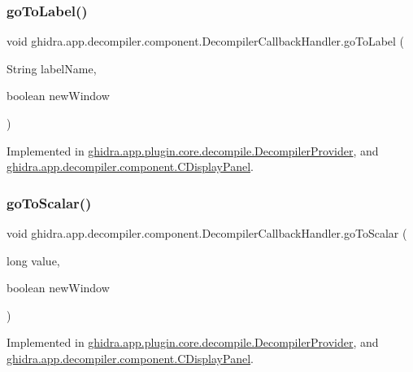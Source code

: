 \subsubsection{\texorpdfstring{goToLabel()}{goToLabel()}}
{\footnotesize\ttfamily void ghidra.\+app.\+decompiler.\+component.\+Decompiler\+Callback\+Handler.\+go\+To\+Label (\begin{DoxyParamCaption}\item[{String}]{label\+Name,  }\item[{boolean}]{new\+Window }\end{DoxyParamCaption})}



Implemented in \mbox{\hyperlink{classghidra_1_1app_1_1plugin_1_1core_1_1decompile_1_1_decompiler_provider_a3012a2929e8b6f83e89da04ee89431d0}{ghidra.\+app.\+plugin.\+core.\+decompile.\+Decompiler\+Provider}}, and \mbox{\hyperlink{classghidra_1_1app_1_1decompiler_1_1component_1_1_c_display_panel_a42edf09645141abad7ba592cab6b2e50}{ghidra.\+app.\+decompiler.\+component.\+C\+Display\+Panel}}.

\mbox{\label{interfaceghidra_1_1app_1_1decompiler_1_1component_1_1_decompiler_callback_handler_a32303b61cd68fd57ce7e33a2973f9372}} 
\subsubsection{\texorpdfstring{goToScalar()}{goToScalar()}}
{\footnotesize\ttfamily void ghidra.\+app.\+decompiler.\+component.\+Decompiler\+Callback\+Handler.\+go\+To\+Scalar (\begin{DoxyParamCaption}\item[{long}]{value,  }\item[{boolean}]{new\+Window }\end{DoxyParamCaption})}



Implemented in \mbox{\hyperlink{classghidra_1_1app_1_1plugin_1_1core_1_1decompile_1_1_decompiler_provider_aa4da717a0d4ecf7e1ac7b54ade004903}{ghidra.\+app.\+plugin.\+core.\+decompile.\+Decompiler\+Provider}}, and \mbox{\hyperlink{classghidra_1_1app_1_1decompiler_1_1component_1_1_c_display_panel_a2f5663eed9340a3ff8cd5ece980d8bb2}{ghidra.\+app.\+decompiler.\+component.\+C\+Display\+Panel}}.

